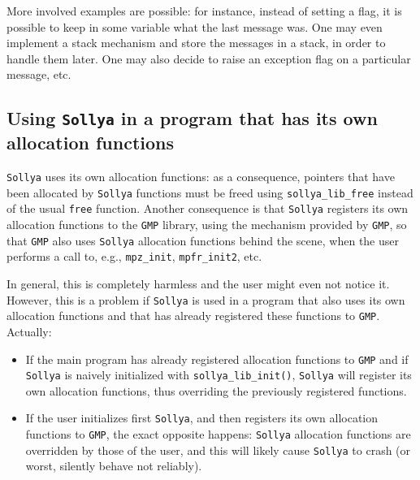 \documentclass[a4paper]{article}
\newcommand{\sollya}{\texttt{Sollya}\xspace}
\begin{document}
More involved examples are possible: for instance, instead of setting a flag, it is possible to keep in some variable what the last message was. One may even implement a stack mechanism and store the messages in a stack, in order to handle them later. One may also decide to raise an exception flag on a particular message, etc.

\subsection{Using \sollya in a program that has its own allocation functions}
\label{customMemoryFunctions}
\sollya uses its own allocation functions: as a consequence, pointers that have been allocated by \sollya functions must be freed using \verb|sollya_lib_free| instead of the usual \verb|free| function. Another consequence is that \sollya registers its own allocation functions to the \verb|GMP| library, using the mechanism provided by \verb|GMP|, so that \verb|GMP| also uses \sollya allocation functions behind the scene, when the user performs a call to, e.g., \verb|mpz_init|, \verb|mpfr_init2|, etc.

In general, this is completely harmless and the user might even not notice it. However, this is a problem if \sollya is used in a program that also uses its own allocation functions and that has already registered these functions to \verb|GMP|. Actually:
\begin{itemize}
\item If the main program has already registered allocation functions to \verb|GMP| and if \sollya is naively initialized with \verb|sollya_lib_init()|, \sollya will register its own allocation functions, thus overriding the previously registered functions.
\item If the user initializes first \sollya, and then registers its own allocation functions to \verb|GMP|, the exact opposite happens: \sollya allocation functions are overridden by those of the user, and this will likely cause \sollya to crash (or worst, silently behave not reliably).
\end{itemize}
\end{document}
